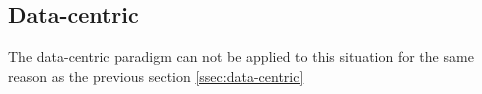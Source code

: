 \subsection{Data-centric}
The data-centric paradigm can not be applied to this situation for the same reason as the previous section \ref{ssec:data-centric}












































































































